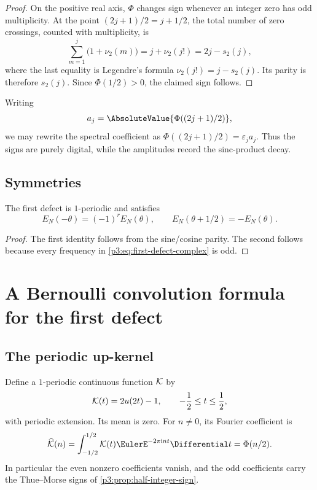 \documentclass[11pt,oneside]{article}
\numberwithin{equation}{section}
\theoremstyle{definition}
\theoremstyle{remark}
\newcommand{\eps}{\varepsilon}
\begin{document}
\begin{proof}
On the positive real axis, $\Phi$ changes sign whenever an integer zero has odd multiplicity.  At the point $(2j+1)/2=j+1/2$, the total number of zero crossings, counted with multiplicity, is
\[
 \sum_{m=1}^{j}\bigl(1+\nu_2(m)\bigr)
 =j+\nu_2(j!)
 =2j-s_2(j),
\]
where the last equality is Legendre's formula $\nu_2(j!)=j-s_2(j)$.  Its parity is therefore $s_2(j)$.  Since $\Phi(1/2)>0$, the claimed sign follows.
\end{proof}

Writing
\begin{equation}
 a_j=\AbsoluteValue{\Phi((2j+1)/2)},
 \label{p3:eq:half-amplitudes}
\end{equation}
we may rewrite the spectral coefficient as $\Phi((2j+1)/2)=\eps_ja_j$.  Thus the signs are purely digital, while the amplitudes record the sinc-product decay.

\subsection{Symmetries}

\begin{corollary}
\label{p3:cor:defect-symmetries}
The first defect is $1$-periodic and satisfies
\begin{equation}
 E_N(-\theta)=(-1)^rE_N(\theta),
 \qquad
 E_N(\theta+1/2)=-E_N(\theta).
 \label{p3:eq:defect-symmetries}
\end{equation}
\end{corollary}

\begin{proof}
The first identity follows from the sine/cosine parity.  The second follows because every frequency in \eqref{p3:eq:first-defect-complex} is odd.
\end{proof}

\section{A Bernoulli convolution formula for the first defect}
\label{p3:sec:bernoulli-kernel}

\subsection{The periodic up-kernel}

Define a $1$-periodic continuous function $\mathcal K$ by
\begin{equation}
 \mathcal K(t)=2u(2t)-1,
 \qquad -\frac12\le t\le\frac12,
 \label{p3:eq:K-kernel}
\end{equation}
with periodic extension.  Its mean is zero.  For $n\ne0$, its Fourier coefficient is
\begin{equation}
 \widehat{\Kcal}(n)
 =\int_{-1/2}^{1/2}\Kcal(t)\EulerE^{-2\pi\iu nt}\Differential t
 =\Phi(n/2).
 \label{p3:eq:K-Fourier}
\end{equation}
In particular the even nonzero coefficients vanish, and the odd coefficients carry the Thue--Morse signs of \cref{p3:prop:half-integer-sign}.
\end{document}
